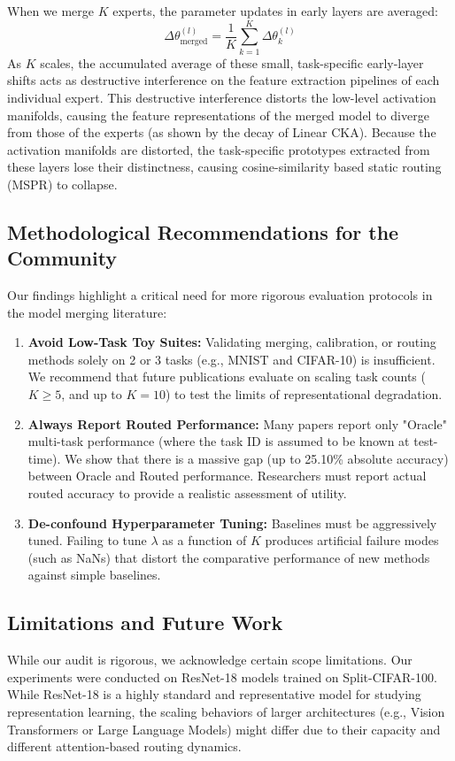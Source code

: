 \documentclass{article}
\theoremstyle{plain}
\theoremstyle{definition}
\theoremstyle{remark}
\begin{document}
When we merge $K$ experts, the parameter updates in early layers are averaged:
\begin{equation}
\Delta \theta_{\text{merged}}^{(l)} = \frac{1}{K} \sum_{k=1}^K \Delta \theta_k^{(l)}
\end{equation}
As $K$ scales, the accumulated average of these small, task-specific early-layer shifts acts as destructive interference on the feature extraction pipelines of each individual expert. This destructive interference distorts the low-level activation manifolds, causing the feature representations of the merged model to diverge from those of the experts (as shown by the decay of Linear CKA). Because the activation manifolds are distorted, the task-specific prototypes extracted from these layers lose their distinctness, causing cosine-similarity based static routing (MSPR) to collapse.

\subsection{Methodological Recommendations for the Community}
Our findings highlight a critical need for more rigorous evaluation protocols in the model merging literature:
\begin{enumerate}
    \item \textbf{Avoid Low-Task Toy Suites:} Validating merging, calibration, or routing methods solely on 2 or 3 tasks (e.g., MNIST and CIFAR-10) is insufficient. We recommend that future publications evaluate on scaling task counts ($K \ge 5$, and up to $K=10$) to test the limits of representational degradation.
    \item \textbf{Always Report Routed Performance:} Many papers report only "Oracle" multi-task performance (where the task ID is assumed to be known at test-time). We show that there is a massive gap (up to 25.10\% absolute accuracy) between Oracle and Routed performance. Researchers must report actual routed accuracy to provide a realistic assessment of utility.
    \item \textbf{De-confound Hyperparameter Tuning:} Baselines must be aggressively tuned. Failing to tune $\lambda$ as a function of $K$ produces artificial failure modes (such as NaNs) that distort the comparative performance of new methods against simple baselines.
\end{enumerate}

\subsection{Limitations and Future Work}
While our audit is rigorous, we acknowledge certain scope limitations. Our experiments were conducted on ResNet-18 models trained on Split-CIFAR-100. While ResNet-18 is a highly standard and representative model for studying representation learning, the scaling behaviors of larger architectures (e.g., Vision Transformers or Large Language Models) might differ due to their capacity and different attention-based routing dynamics.
\end{document}
